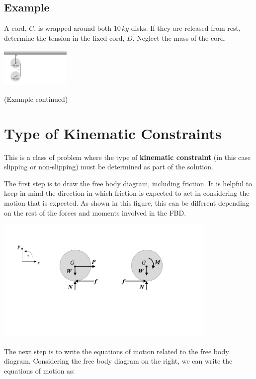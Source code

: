 \documentclass[12pt,letterpaper,twoside]{report}
\begin{document}
\subsection{Example}
A cord, $C$, is wrapped around both $10 \, kg$ disks.  If they are released from rest, determine the tension in the fixed cord, $D$.  Neglect the mass of the cord.  

\includegraphics[trim={2cm 1cm 23cm 1cm},clip,width=0.25\textwidth, left]{Slide57} 

\vspace*{10\baselineskip}

\newpage
(Example continued)
\newpage

\section{Type of Kinematic Constraints}
This is a class of problem where the type of \textbf{kinematic constraint} (in this case slipping or non-slipping) must be determined as part of the solution.  

The first step is to draw the free body diagram, including friction. It is helpful to keep in mind the direction in which friction is expected to act in considering the motion that is expected.  As shown in this figure, this can be different depending on the rest of the forces and moments involved in the FBD.

\includegraphics[trim={1cm 7cm 6cm 3cm},clip,width=0.8\textwidth, left]{Slide58} 

The next step is to write the equations of motion related to the free body diagram.  Considering the free body diagram on the right, we can write the equations of motion as:
\vspace*{8\baselineskip}
\end{document}
